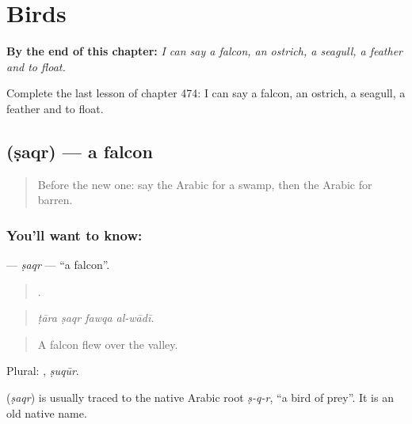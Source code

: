 
\chapter{Birds}
\label{ch:ar-birds}

\begin{chapteropening}
\textbf{By the end of this chapter:} \emph{I can say a falcon, an ostrich, a seagull, a feather and to float.}

Complete the last lesson of chapter 474: I can say a falcon, an ostrich, a seagull, a feather and to float.
\end{chapteropening}

\section[\texorpdfstring{\ar{صقر} (ṣaqr)}{صقر (ṣaqr)}]{ (ṣaqr) — a falcon}

\label{lesson:AR-C474-saqr}



\begin{quote}
Before the new one: say the Arabic for a swamp, then the Arabic for barren.
\end{quote}

\subsection*{You'll want to know: }
\textbf{} — \emph{ṣaqr} — \textquotedblleft{}a falcon\textquotedblright{}.

\begin{quote}
   .
\end{quote}

\begin{quote}
\emph{ṭāra ṣaqr fawqa al-wādī.}
\end{quote}

\begin{quote}
A falcon flew over the valley.
\end{quote}

Plural: , \emph{ṣuqūr}.

\begin{cousinweb}
\textbf{} (\emph{ṣaqr}) is usually traced to the native Arabic root \emph{ṣ-q-r}, \textquotedblleft{}a bird of prey\textquotedblright{}. It is an old native name.
\end{cousinweb}

